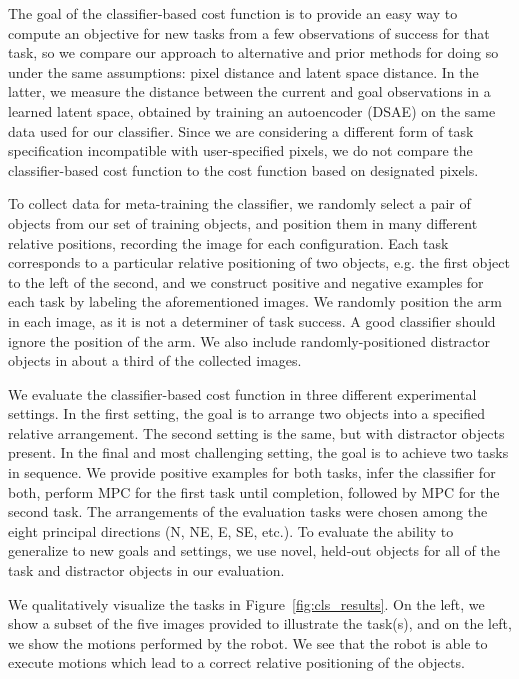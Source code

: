 
The goal of the classifier-based cost function is to provide an easy way to compute an objective for new tasks from a few observations of success for that task, so we compare our approach to alternative and prior methods for doing so under the same assumptions: pixel distance and latent space distance. In the latter, we measure the distance between the current and goal observations in a learned latent space, obtained by training an autoencoder (DSAE) \cite{dsae} on the same data used for our classifier. Since we are considering a different form of task specification incompatible with user-specified pixels, we do not compare the classifier-based cost function to the cost function based on designated pixels.

To collect data for meta-training the classifier, we randomly select a pair of objects from our set of training objects, and position them in many different relative positions, recording the image for each configuration. Each task corresponds to a particular relative positioning of two objects, e.g. the first object to the left of the second, and we construct positive and negative examples for each task by labeling the aforementioned images. We randomly position the arm in each image, as it is not a determiner of task success. A good classifier should ignore the position of the arm. We also include randomly-positioned distractor objects in about a third of the collected images.

We evaluate the classifier-based cost function in three different experimental settings. In the first setting, the goal is to arrange two objects into a specified relative arrangement. The second setting is the same, but with distractor objects present. In the final and most challenging setting, the goal is to achieve two tasks in sequence. We provide positive examples for both tasks, infer the classifier for both, perform MPC for the first task until completion, followed by MPC for the second task. The arrangements of the evaluation tasks were chosen among the eight principal directions (N, NE, E, SE, etc.). To evaluate the ability to generalize to new goals and settings, we use novel, held-out objects for all of the task and distractor objects in our evaluation.

We qualitatively visualize the tasks in Figure~\ref{fig:cls_results}. On the left, we show a subset of the five images provided to illustrate the task(s), and on the left, we show the motions performed by the robot. We see that the robot is able to execute motions which lead to a correct relative positioning of the objects.

